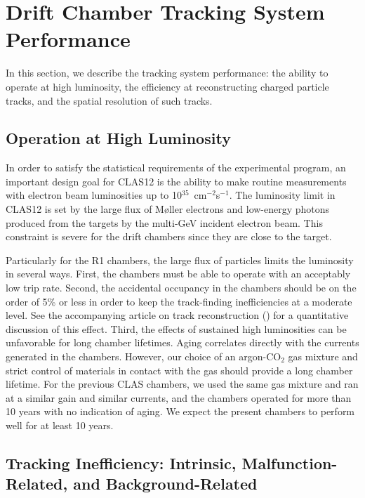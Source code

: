 \section{Drift Chamber Tracking System Performance}

In this section, we describe the tracking system performance: the ability to operate at high luminosity,
the efficiency at reconstructing charged particle tracks, and the spatial resolution of such tracks.

\subsection{Operation at High Luminosity}

In order to satisfy the statistical requirements of the experimental program, an important design
goal for CLAS12 is the ability to make routine measurements with electron beam luminosities up to
10$^{35}$~cm$^{-2}$s$^{-1}$.  The luminosity limit in CLAS12 is set by the large flux of M{\o}ller
electrons and low-energy photons 
produced from the targets by the multi-GeV incident electron beam.  This 
constraint is severe for the drift chambers since they are close to the 
target. 

Particularly for the R1 chambers, the large flux of particles limits the luminosity in several ways.
First, the chambers must be able to operate with an acceptably low trip rate.
Second, the accidental occupancy in the chambers should be on the order
of 5\% or less in order to keep the track-finding inefficiencies at a moderate 
level.  See the accompanying article on track reconstruction (\cite{recon-nim})
for a quantitative discussion of this effect.  Third, the effects of sustained high 
luminosities can be unfavorable for long chamber lifetimes.  Aging correlates 
directly with the currents generated in the chambers.
However, our choice of an argon-CO$_2$ gas mixture and strict control of
materials in contact with the gas should provide a long chamber lifetime.
For the previous CLAS chambers, we used the same gas mixture and ran at a
similar gain and similar currents, and the chambers operated for more than 10 years 
with no indication of aging.  We expect the present
chambers to perform well for at least 10 years.

\subsection{Tracking Inefficiency: Intrinsic, Malfunction-Related, and Background-Related}

